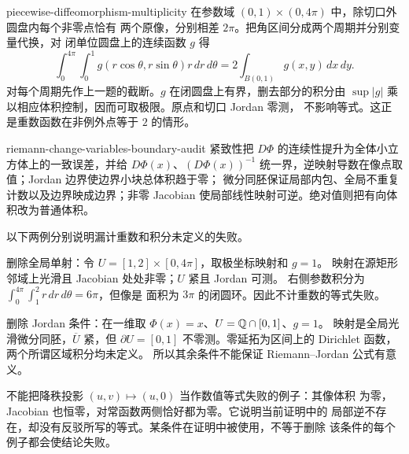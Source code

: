\begin{solution}{piecewise-diffeomorphism-multiplicity}
在参数域 \((0,1)\times(0,4\pi)\) 中，除切口外圆盘内每个非零点恰有
两个原像，分别相差 \(2\pi\)。把角区间分成两个周期并分别变量代换，对
闭单位圆盘上的连续函数 \(g\) 得
\[
 \int_0^{4\pi}\int_0^1
 g(r\cos\theta,r\sin\theta)r\,dr\,d\theta
 =2\int_{B(0,1)}g(x,y)\,dx\,dy.
\]
对每个周期先作上一题的截断。$g$ 在闭圆盘上有界，删去部分的积分由
$\sup|g|$ 乘以相应体积控制，因而可取极限。原点和切口 Jordan 零测，
不影响等式。这正是重数函数在非例外点等于
\(2\) 的情形。
\end{solution}

\begin{solution}{riemann-change-variables-boundary-audit}
紧致性把 \(D\Phi\) 的连续性提升为全体小立方体上的一致误差，并给
\(D\Phi(x)\)、\((D\Phi(x))^{-1}\) 统一界，逆映射导数在像点取值；Jordan 边界使边界小块总体积趋于零；
微分同胚保证局部内包、全局不重复计数以及边界映成边界；非零 Jacobian
使局部线性映射可逆。绝对值则把有向体积改为普通体积。

以下两例分别说明漏计重数和积分未定义的失败。

删除全局单射：令 $U=[1,2]\times[0,4\pi]$，取极坐标映射和 $g=1$。
映射在源矩形邻域上光滑且 Jacobian 处处非零；$U$ 紧且 Jordan 可测。
右侧参数积分为 $\int_0^{4\pi}\int_1^2r\,dr\,d\theta=6\pi$，但像是
面积为 $3\pi$ 的闭圆环。因此不计重数的等式失败。

删除 Jordan 条件：在一维取 $\Phi(x)=x$、$U=\mathbb{Q}\cap[0,1]$、$g=1$。
映射是全局光滑微分同胚，$\overline U$ 紧，但 $\partial U=[0,1]$
不零测。零延拓为区间上的 Dirichlet 函数，两个所谓区域积分均未定义。
所以其余条件不能保证 Riemann--Jordan 公式有意义。

不能把降秩投影 $(u,v)\mapsto(u,0)$ 当作数值等式失败的例子：其像体积
为零，Jacobian 也恒零，对常函数两侧恰好都为零。它说明当前证明中的
局部逆不存在，却没有反驳所写的等式。某条件在证明中被使用，不等于删除
该条件的每个例子都会使结论失败。
\end{solution}

